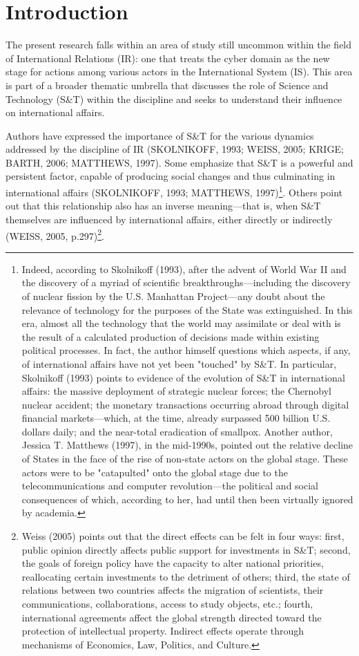 \chapter{Introduction}

The present research falls within an area of study still uncommon within the field of International Relations (IR): one that treats the cyber domain as the new stage for actions among various actors in the International System (IS). This area is part of a broader thematic umbrella that discusses the role of Science and Technology (S\&T) within the discipline and seeks to understand their influence on international affairs.

Authors have expressed the importance of S\&T for the various dynamics addressed by the discipline of IR (SKOLNIKOFF, 1993; WEISS, 2005; KRIGE; BARTH, 2006; MATTHEWS, 1997). Some emphasize that S\&T is a powerful and persistent factor, capable of producing social changes and thus culminating in international affairs (SKOLNIKOFF, 1993; MATTHEWS, 1997)\footnote{Indeed, according to Skolnikoff (1993), after the advent of World War II and the discovery of a myriad of scientific breakthroughs—including the discovery of nuclear fission by the U.S. Manhattan Project—any doubt about the relevance of technology for the purposes of the State was extinguished. In this era, almost all the technology that the world may assimilate or deal with is the result of a calculated production of decisions made within existing political processes. In fact, the author himself questions which aspects, if any, of international affairs have not yet been "touched" by S\&T. In particular, Skolnikoff (1993) points to evidence of the evolution of S\&T in international affairs: the massive deployment of strategic nuclear forces; the Chernobyl nuclear accident; the monetary transactions occurring abroad through digital financial markets—which, at the time, already surpassed 500 billion U.S. dollars daily; and the near-total eradication of smallpox. Another author, Jessica T. Matthews (1997), in the mid-1990s, pointed out the relative decline of States in the face of the rise of non-state actors on the global stage. These actors were to be "catapulted" onto the global stage due to the telecommunications and computer revolution—the political and social consequences of which, according to her, had until then been virtually ignored by academia.}.
Others point out that this relationship also has an inverse meaning—that is, when S\&T themselves are influenced by international affairs, either directly or indirectly (WEISS, 2005, p.297)\footnote{Weiss (2005) points out that the direct effects can be felt in four ways: first, public opinion directly affects public support for investments in S\&T; second, the goals of foreign policy have the capacity to alter national priorities, reallocating certain investments to the detriment of others; third, the state of relations between two countries affects the migration of scientists, their communications, collaborations, access to study objects, etc.; fourth, international agreements affect the global strength directed toward the protection of intellectual property. Indirect effects operate through mechanisms of Economics, Law, Politics, and Culture.}.
